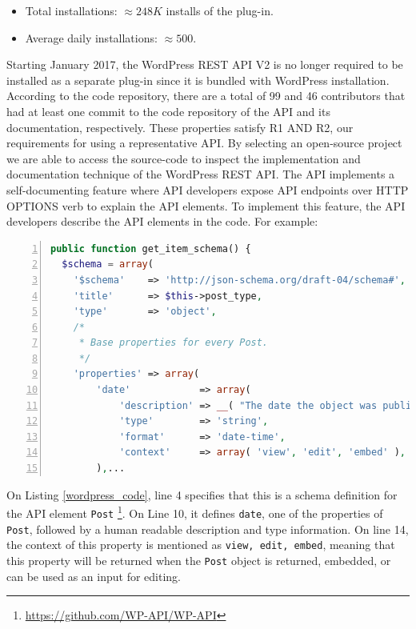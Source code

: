 \documentclass[conference]{IEEEtran}
\begin{document}
\begin{itemize}
  \item Total installations: $ \approx 248K$ installs of the plug-in.
  \item Average daily installations: $ \approx 500$.
\end{itemize}

Starting January 2017, the WordPress REST API V2 is no longer required to be installed as a separate plug-in since it is bundled with WordPress installation. According to the code repository, there are a total of 99 and 46 contributors that had at least one commit to the code repository of the API and its documentation, respectively. These properties satisfy R1 AND R2, our requirements for using a representative API. By selecting an open-source project we are able to access the source-code to inspect the implementation and documentation technique of the WordPress REST API. The API implements a self-documenting feature where API developers expose API endpoints over HTTP OPTIONS verb to explain the API elements. To implement this feature, the API developers describe the API elements in the code. For example:

\lstset{basicstyle=\ttfamily\footnotesize,breaklines=true}
\begin{lstlisting}[language=php,showspaces=false,showstringspaces=false,numbers=left,xleftmargin=2em,caption={Example of self-documenting API Code in PHP},label=wordpress_code]
public function get_item_schema() {
  $schema = array(
    '$schema'    => 'http://json-schema.org/draft-04/schema#',
    'title'      => $this->post_type,
    'type'       => 'object',
    /*
     * Base properties for every Post.
     */
    'properties' => array(
        'date'            => array(
            'description' => __( "The date the object was published, in the site's timezone." ),
            'type'        => 'string',
            'format'      => 'date-time',
            'context'     => array( 'view', 'edit', 'embed' ),
        ),...
\end{lstlisting}

On Listing \ref{wordpress_code}, line 4 specifies that this is a schema definition for the API element \lstinline{Post} \footnote{\url{https://github.com/WP-API/WP-API}}. On Line 10, it defines \lstinline{date}, one of the properties of \lstinline{Post}, followed by a human readable description and type information. On line 14, the context of this property is mentioned as \lstinline{view, edit, embed}, meaning that this property will be returned when the \lstinline{Post} object is returned, embedded, or can be used as an input for editing.
\end{document}
